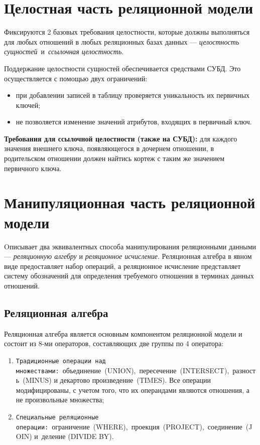 \section{Целостная часть реляционной модели}

Фиксируются 2 базовых требования целостности, которые должны выполняться для любых отношений в любых реляционных базах данных --- \textit{целостность сущностей} и \textit{ссылочная целостность}.

Поддержание целостности сущностей обеспечивается средствами СУБД. 
Это осуществляется с помощью двух ограничений:

\begin{itemize}[label*=--]
	\item при добавлении записей в таблицу проверяется уникальность их первичных ключей;
	\item не позволяется изменение значений атрибутов, входящих в первичный ключ.
\end{itemize}

\clearpage

\textbf{Требования для ссылочной целостности (также на СУБД):} для каждого значения внешнего ключа, появляющегося в дочернем отношении, в родительском отношении должен найтись кортеж с таким же значением первичного ключа.

\section{Манипуляционная часть реляционной модели}

Oписывает два эквивалентных способа манипулирования реляционными данными — \textit{реляционную алгебру} и \textit{реляционное исчисление}. Реляционная алгебра в явном виде предоставляет набор операций, а реляционное исчисление представляет систему обозначений для определения требуемого отношения в терминах данных отношений.

\subsection*{Реляционная алгебра}

Реляционная алгебра является основным компонентом реляционной модели и состоит из 8-ми операторов, составляющих две группы по 4 оператора:

\begin{enumerate}[label={\arabic*)}]
	\item \texttt{Традиционные операции над множествами:} объединение (UNION), пересечение (INTERSECT), разность (MINUS) и декартово произведение (TIMES). Все операции модифицированы, с учетом того, что их операндами являются отношения, а не произвольные множества;
	\item \texttt{Специальные реляционные операции:} ограничение (WHERE), проекция (PROJECT), соединение (JOIN) и деление (DIVIDE BY).
\end{enumerate}

